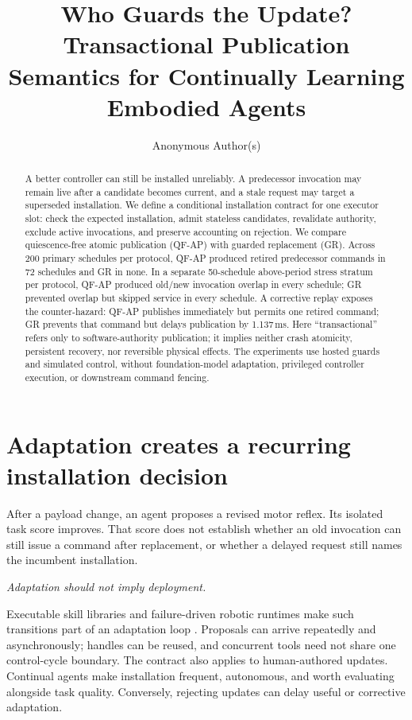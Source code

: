 \documentclass{article}
\title{Who Guards the Update? Transactional Publication Semantics for Continually Learning Embodied Agents}
\author{Anonymous Author(s)}
\begin{document}
\maketitle
\begin{abstract}
A better controller can still be installed unreliably. A predecessor invocation may remain live after a candidate becomes current, and a stale request may target a superseded installation. We define a conditional installation contract for one executor slot: check the expected installation, admit stateless candidates, revalidate authority, exclude active invocations, and preserve accounting on rejection. We compare quiescence-free atomic publication (QF-AP) with guarded replacement (GR). Across 200 primary schedules per protocol, QF-AP produced retired predecessor commands in 72 schedules and GR in none. In a separate 50-schedule above-period stress stratum per protocol, QF-AP produced old/new invocation overlap in every schedule; GR prevented overlap but skipped service in every schedule. A corrective replay exposes the counter-hazard: QF-AP publishes immediately but permits one retired command; GR prevents that command but delays publication by 1.137\,ms. Here ``transactional'' refers only to software-authority publication; it implies neither crash atomicity, persistent recovery, nor reversible physical effects. The experiments use hosted guards and simulated control, without foundation-model adaptation, privileged controller execution, or downstream command fencing.
\end{abstract}

\section{Adaptation creates a recurring installation decision}
After a payload change, an agent proposes a revised motor reflex. Its isolated task score improves. That score does not establish whether an old invocation can still issue a command after replacement, or whether a delayed request still names the incumbent installation.

\emph{Adaptation should not imply deployment.}

Executable skill libraries and failure-driven robotic runtimes make such transitions part of an adaptation loop \citep{wang2023voyager,tian2026abot}. Proposals can arrive repeatedly and asynchronously; handles can be reused, and concurrent tools need not share one control-cycle boundary. The contract also applies to human-authored updates. Continual agents make installation frequent, autonomous, and worth evaluating alongside task quality. Conversely, rejecting updates can delay useful or corrective adaptation.
\end{document}
